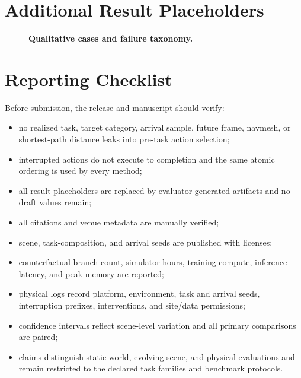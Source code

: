 \section{Additional Result Placeholders}
\label{app:results}

\begin{table}[h]
  \centering
  \caption{\textbf{Per-task-family results.}}
  \label{tab:family}
\end{table}

\begin{table}[h]
  \centering
  \caption{\textbf{Component ablations.}}
  \label{tab:component-ablations}
\end{table}

\begin{figure}[H]
  \centering
  \caption{\textbf{Qualitative cases and failure taxonomy.}}
  \label{fig:qualitative}
\end{figure}

\section{Reporting Checklist}
\label{app:checklist}

Before submission, the release and manuscript should verify:
\begin{itemize}[leftmargin=*]
  \item no realized task, target category, arrival sample, future frame, navmesh, or shortest-path distance leaks into pre-task action selection;
  \item interrupted actions do not execute to completion and the same atomic ordering is used by every method;
  \item all result placeholders are replaced by evaluator-generated artifacts and no draft values remain;
  \item all citations and venue metadata are manually verified;
  \item scene, task-composition, and arrival seeds are published with licenses;
  \item counterfactual branch count, simulator hours, training compute, inference latency, and peak memory are reported;
  \item physical logs record platform, environment, task and arrival seeds, interruption prefixes, interventions, and site/data permissions;
  \item confidence intervals reflect scene-level variation and all primary comparisons are paired;
  \item claims distinguish static-world, evolving-scene, and physical evaluations and remain restricted to the declared task families and benchmark protocols.
\end{itemize}
